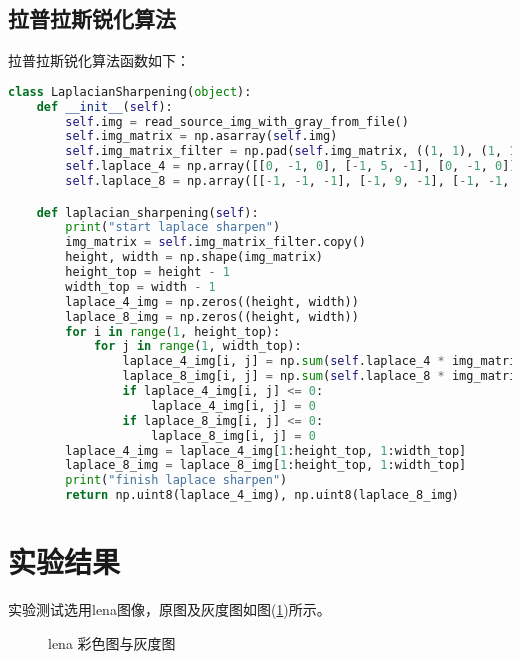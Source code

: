 \documentclass{hitreport}
\begin{document}
\subsection{拉普拉斯锐化算法}\label{sec:lap}

拉普拉斯锐化算法函数如下：
\begin{lstlisting}[language=python]
class LaplacianSharpening(object):
    def __init__(self):
        self.img = read_source_img_with_gray_from_file()
        self.img_matrix = np.asarray(self.img)
        self.img_matrix_filter = np.pad(self.img_matrix, ((1, 1), (1, 1)), 'constant', constant_values=(0, 0))
        self.laplace_4 = np.array([[0, -1, 0], [-1, 5, -1], [0, -1, 0]])
        self.laplace_8 = np.array([[-1, -1, -1], [-1, 9, -1], [-1, -1, -1]])

    def laplacian_sharpening(self):
        print("start laplace sharpen")
        img_matrix = self.img_matrix_filter.copy()
        height, width = np.shape(img_matrix)
        height_top = height - 1
        width_top = width - 1
        laplace_4_img = np.zeros((height, width))
        laplace_8_img = np.zeros((height, width))
        for i in range(1, height_top):
            for j in range(1, width_top):
                laplace_4_img[i, j] = np.sum(self.laplace_4 * img_matrix[i - 1:i + 2, j - 1:j + 2])
                laplace_8_img[i, j] = np.sum(self.laplace_8 * img_matrix[i - 1:i + 2, j - 1:j + 2])
                if laplace_4_img[i, j] <= 0:
                    laplace_4_img[i, j] = 0
                if laplace_8_img[i, j] <= 0:
                    laplace_8_img[i, j] = 0
        laplace_4_img = laplace_4_img[1:height_top, 1:width_top]
        laplace_8_img = laplace_8_img[1:height_top, 1:width_top]
        print("finish laplace sharpen")
        return np.uint8(laplace_4_img), np.uint8(laplace_8_img)
\end{lstlisting}

\section{实验结果}

实验测试选用lena图像，原图及灰度图如图(\ref{fig:lena})所示。

\begin{figure}[h]
	\centering
	\hspace{20pt}
	\caption{lena 彩色图与灰度图}\label{fig:lena}
\end{figure}
\end{document}
